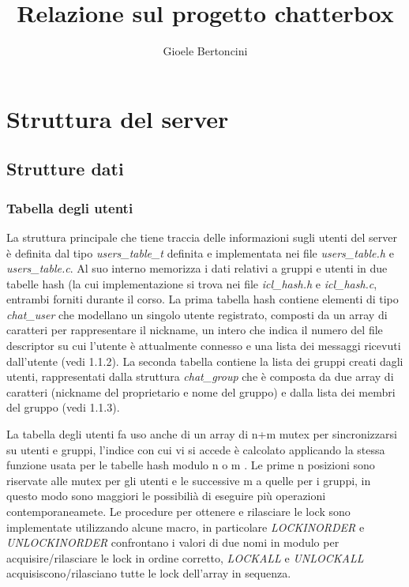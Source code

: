 \documentclass[11pt]{article}
\title{\textbf{Relazione sul progetto chatterbox}}
\author{Gioele Bertoncini}
\date{}
\begin{document}
\maketitle

\section{Struttura del server}
\subsection{Strutture dati}

\subsubsection{Tabella degli utenti}
La struttura principale che tiene traccia delle informazioni sugli utenti del server è definita dal tipo \emph{users\_table\_t} definita e implementata nei file \emph{users\_table.h} e \emph{users\_table.c}. Al suo interno memorizza i dati relativi a gruppi e utenti in due tabelle hash (la cui implementazione si trova nei file \emph{icl\_hash.h} e \emph{icl\_hash.c}, entrambi forniti durante il corso. La prima tabella hash contiene elementi di tipo \emph{chat\_user} che modellano un singolo utente registrato, composti da un array di caratteri per rappresentare il nickname, un intero che indica il numero del file descriptor su cui l'utente è attualmente connesso e una lista dei messaggi ricevuti dall'utente (vedi 1.1.2). La seconda tabella contiene la lista dei gruppi creati dagli utenti, rappresentati dalla struttura \emph{chat\_group} che è composta da due array di caratteri (nickname del proprietario e nome del gruppo) e dalla lista dei membri del gruppo (vedi 1.1.3).

La tabella degli utenti fa uso anche di un array di n+m mutex per sincronizzarsi su utenti e gruppi, l'indice con cui vi si accede è calcolato applicando la stessa funzione usata per le tabelle hash modulo n o m . Le prime n posizioni sono riservate alle mutex per gli utenti e le successive m a quelle per i gruppi, in questo modo sono maggiori le possibilià di eseguire più operazioni contemporaneamete. Le procedure per ottenere e rilasciare le lock sono implementate utilizzando alcune macro, in particolare \emph{LOCKINORDER} e \emph{UNLOCKINORDER} confrontano i valori di due nomi in modulo per acquisire/rilasciare le lock in ordine corretto, \emph{LOCKALL} e \emph{UNLOCKALL} acquisiscono/rilasciano tutte le lock dell'array in sequenza.
\end{document}
